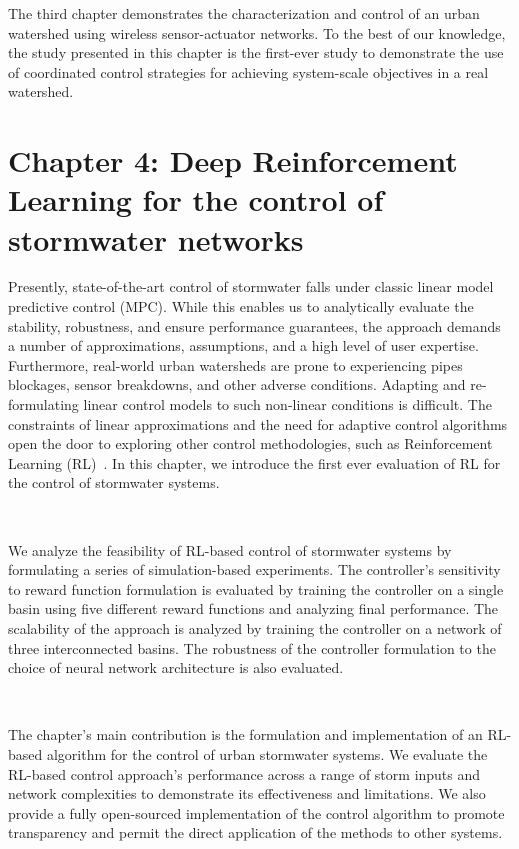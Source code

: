 The third chapter demonstrates the characterization and control of an urban watershed using wireless sensor-actuator networks. 
To the best of our knowledge, the study presented in this chapter is the first-ever study to demonstrate the use of coordinated control strategies for achieving system-scale objectives in a real watershed.

\section{Chapter 4: Deep Reinforcement Learning for the control of stormwater networks}

Presently, state-of-the-art control of stormwater falls under classic linear model predictive control (MPC)\cite{Wong_Kerkez_2018}.
While this enables us to analytically evaluate the stability, robustness, and ensure performance guarantees, the approach demands a number of approximations, assumptions, and a high level of user expertise\cite{Wong_Kerkez_2018, Ocampo-Martinez_2015, joseph2014hybrid}.
Furthermore, real-world urban watersheds are prone to experiencing pipes blockages, sensor breakdowns, and other adverse conditions\cite{national2009urban}.
Adapting and re-formulating linear control models to such non-linear conditions is difficult.
The constraints of linear approximations and the need for adaptive control algorithms open the door to exploring other control methodologies, such as Reinforcement Learning (RL)~\cite{Sutton98}.
In this chapter, we introduce the first ever evaluation of RL for the control of stormwater systems.

\

We analyze the feasibility of RL-based control of stormwater systems by formulating a series of simulation-based experiments.
The controller's sensitivity to reward function formulation is evaluated by training the controller on a single basin using five different reward functions and analyzing final performance.
The scalability of the approach is analyzed by training the controller on a network of three interconnected basins.
The robustness of the controller formulation to the choice of neural network architecture is also evaluated.


\

The chapter's main contribution is the formulation and implementation of an RL-based algorithm for the control of urban stormwater systems.
We evaluate the RL-based control approach's performance across a range of storm inputs and network complexities to demonstrate its effectiveness and limitations.
We also provide a fully open-sourced implementation of the control algorithm to promote transparency and permit the direct application of the methods to other systems.


